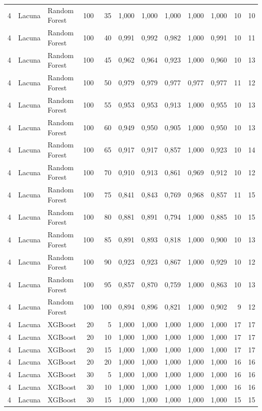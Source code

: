 \begin{longtable}{@{}rllrrrrrrrrr@{}}
4 & Lacuna & Random Forest & 100 & 35 & 1,000 & 1,000 & 1,000 & 1,000 & 1,000 & 10 & 10 \\
4 & Lacuna & Random Forest & 100 & 40 & 0,991 & 0,992 & 0,982 & 1,000 & 0,991 & 10 & 11 \\
4 & Lacuna & Random Forest & 100 & 45 & 0,962 & 0,964 & 0,923 & 1,000 & 0,960 & 10 & 13 \\
4 & Lacuna & Random Forest & 100 & 50 & 0,979 & 0,979 & 0,977 & 0,977 & 0,977 & 11 & 12 \\
4 & Lacuna & Random Forest & 100 & 55 & 0,953 & 0,953 & 0,913 & 1,000 & 0,955 & 10 & 13 \\
4 & Lacuna & Random Forest & 100 & 60 & 0,949 & 0,950 & 0,905 & 1,000 & 0,950 & 10 & 13 \\
4 & Lacuna & Random Forest & 100 & 65 & 0,917 & 0,917 & 0,857 & 1,000 & 0,923 & 10 & 14 \\
4 & Lacuna & Random Forest & 100 & 70 & 0,910 & 0,913 & 0,861 & 0,969 & 0,912 & 10 & 12 \\
4 & Lacuna & Random Forest & 100 & 75 & 0,841 & 0,843 & 0,769 & 0,968 & 0,857 & 11 & 15 \\
4 & Lacuna & Random Forest & 100 & 80 & 0,881 & 0,891 & 0,794 & 1,000 & 0,885 & 10 & 15 \\
4 & Lacuna & Random Forest & 100 & 85 & 0,891 & 0,893 & 0,818 & 1,000 & 0,900 & 10 & 13 \\
4 & Lacuna & Random Forest & 100 & 90 & 0,923 & 0,923 & 0,867 & 1,000 & 0,929 & 10 & 12 \\
4 & Lacuna & Random Forest & 100 & 95 & 0,857 & 0,870 & 0,759 & 1,000 & 0,863 & 10 & 13 \\
4 & Lacuna & Random Forest & 100 & 100 & 0,894 & 0,896 & 0,821 & 1,000 & 0,902 & 9 & 12 \\
4 & Lacuna & XGBoost & 20 & 5 & 1,000 & 1,000 & 1,000 & 1,000 & 1,000 & 17 & 17 \\
4 & Lacuna & XGBoost & 20 & 10 & 1,000 & 1,000 & 1,000 & 1,000 & 1,000 & 17 & 17 \\
4 & Lacuna & XGBoost & 20 & 15 & 1,000 & 1,000 & 1,000 & 1,000 & 1,000 & 17 & 17 \\
4 & Lacuna & XGBoost & 20 & 20 & 1,000 & 1,000 & 1,000 & 1,000 & 1,000 & 16 & 16 \\
4 & Lacuna & XGBoost & 30 & 5 & 1,000 & 1,000 & 1,000 & 1,000 & 1,000 & 16 & 16 \\
4 & Lacuna & XGBoost & 30 & 10 & 1,000 & 1,000 & 1,000 & 1,000 & 1,000 & 16 & 16 \\
4 & Lacuna & XGBoost & 30 & 15 & 1,000 & 1,000 & 1,000 & 1,000 & 1,000 & 15 & 15 \\

\end{longtable}
